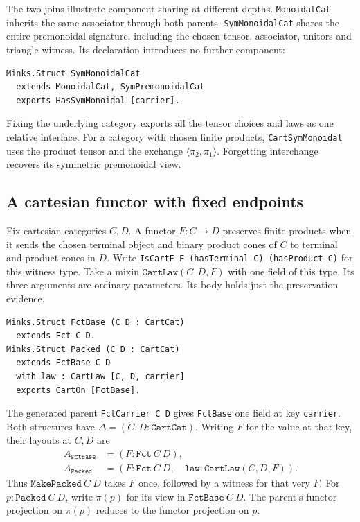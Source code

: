 \documentclass{article}
\newcommand{\ttt}[1]{\texttt{#1}}
\begin{document}
The two joins illustrate component sharing at different depths.
\ttt{MonoidalCat} inherits the same associator through both parents.
\ttt{SymMonoidalCat} shares the entire premonoidal signature, including
the chosen tensor, associator, unitors and triangle witness. Its
declaration introduces no further component:
\begin{verbatim}
Minks.Struct SymMonoidalCat
  extends MonoidalCat, SymPremonoidalCat
  exports HasSymMonoidal [carrier].
\end{verbatim}
Fixing the underlying category exports all the tensor choices and laws
as one relative interface. For a category with chosen finite products,
\ttt{CartSymMonoidal} uses the product tensor and the exchange
$\langle\pi_2,\pi_1\rangle$. Forgetting interchange recovers its
symmetric premonoidal view.
\clearpage

\subsection{A cartesian functor with fixed endpoints}
Fix cartesian categories $C,D$. A functor $F:C\to D$ preserves finite
products when it sends the chosen terminal object and binary product
cones of $C$ to terminal and product cones in $D$. Write \ttt{IsCartF F (hasTerminal C) (hasProduct C)} for this witness type. Take a mixin
$\ttt{CartLaw}(C,D,F)$ with one field of this type. Its three arguments
are ordinary parameters. Its body holds just the preservation evidence.

\begin{verbatim}
Minks.Struct FctBase (C D : CartCat)
  extends Fct C D.
Minks.Struct Packed (C D : CartCat)
  extends FctBase C D
  with law : CartLaw [C, D, carrier]
  exports CartOn [FctBase].
\end{verbatim}
The generated parent \ttt{FctCarrier C D} gives \ttt{FctBase} one field at key
\ttt{carrier}. Both structures have $\Delta=(C,D:\ttt{CartCat})$.
Writing $F$ for the value at that key, their layouts at $C,D$ are
\[
\begin{aligned}
 A_{\ttt{FctBase}} &= (F:\ttt{Fct}\ C\ D),\\
 A_{\ttt{Packed}}  &= (F:\ttt{Fct}\ C\ D,\quad
                       \ttt{law}:\ttt{CartLaw}(C,D,F)).
\end{aligned}
\]
Thus $\ttt{MakePacked}\ C\ D$ takes $F$ once, followed by a witness
for that very $F$. For $p:\ttt{Packed}\ C\ D$, write $\pi(p)$ for its
view in $\ttt{FctBase}\ C\ D$. The parent's functor projection on
$\pi(p)$ reduces to the functor projection on $p$.
\end{document}
